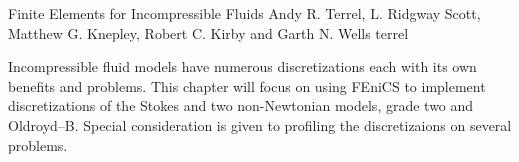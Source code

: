               {Finite Elements for Incompressible Fluids}
              {Andy R. Terrel, L. Ridgway Scott, Matthew G. Knepley, Robert C. Kirby and Garth N. Wells}
              {terrel}

Incompressible fluid models have numerous discretizations each with
its own benefits and problems. This chapter will focus on using FEniCS
to implement discretizations of the Stokes and two non-Newtonian
models, grade two and Oldroyd--B. Special consideration is given to
profiling the discretizaions on several problems.
